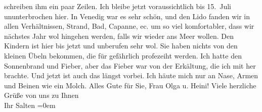 \begin{ledgroupsized}[t]{13cm}
               schreiben ihm ein paar Zeilen. Ich bleibe jetzt voraussichtlich bis 15. Juli ununterbrochen hier. In Venedig war es sehr schön, und den Lido
               fanden wir in allen Verhältnissen, Strand, Bad, Capanne, ec. um so viel komfortabler,
               dass wir nächstes Jahr wol hingehen werden, falls wir wieder ans Meer wollen. Den Kindern ist hier bis
               jetzt und unberufen sehr wol. Sie haben nichts von den kleinen Übeln bekommen, die
               für gefährlich profezeiht werden. Ich hatte den Sonnenbrand und Fieber, aber das
               Fieber war von der Erkältung, die ich mit her brachte. Und jetzt ist auch das längst
               vorbei. Ich häute mich nur an Nase, Armen und Beinen wie ein Molch. Alles Gute für
               Sie, Frau Olga u. Heini!\pend
           \pstart
           Viele herzliche Grüße von uns zu Ihnen {\\[\baselineskip]}Ihr \spacefill\mbox{Salten}\pend
           \leftskip=0em{}
         
         \endnumbering{}\end{ledgroupsized}  \newcommand{\dateiname}{L03501}\newcommand{\titel}{Felix Salten an Arthur Schnitzler, 29. 6. 1909}\newcommand{\editorInnen}{Martin Anton Müller und Laura Untner}
      